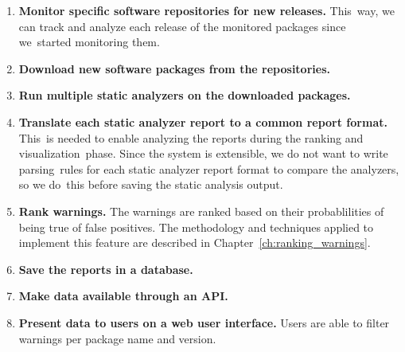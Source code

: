 \begin{enumerate}
\item \textbf{Monitor specific software repositories for new releases.} This\
way, we can track and analyze each release of the monitored packages since we\
started monitoring them.

\item \textbf{Download new software packages from the repositories.}

\item \textbf{Run multiple static analyzers on the downloaded packages.}

\item \textbf{Translate each static analyzer report to a common report format.} This\
is needed to enable analyzing the reports during the ranking and visualization\
phase. Since the system is extensible, we do not want to write parsing\
rules for each static analyzer report format to compare the analyzers, so we do\
this before saving the static analysis output.

\item \textbf{Rank warnings.} The warnings are ranked based on their probablilities of being true of false positives. The methodology and techniques applied to implement this feature are described in Chapter~\ref{ch:ranking_warnings}.

\item \textbf{Save the reports in a database.}

\item \textbf{Make data available through an API.}

\item \textbf{Present data to users on a web user interface.} Users are able to filter warnings per package name and version.
\end{enumerate}


